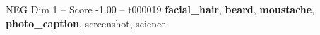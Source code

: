 \begin{textsample}{NEG Dim 1 – Score -1.00 – t000019}  \label{ex:f1_neg_027}
\textbf{facial\_hair}, \textbf{beard}, \textbf{moustache}, \textbf{photo\_caption}, screenshot, science

\end{textsample}
